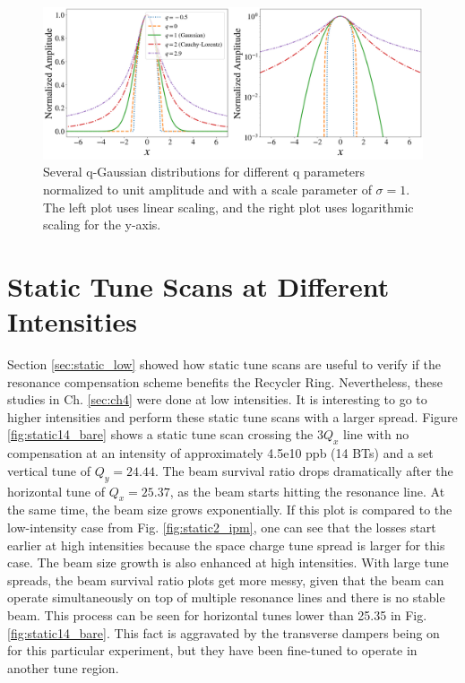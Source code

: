 \begin{figure}[H]
    \centering
    \includegraphics[width=\textwidth,keepaspectratio]{chapter6/qgaussians.png}
    \caption{Several q-Gaussian distributions for different q parameters normalized to unit amplitude and with a scale parameter of $\sigma=1$. The left plot uses linear scaling, and the right plot uses logarithmic scaling for the y-axis.}
    \label{fig:qgaussians}
\end{figure}


\section{\label{sec:static_high}Static Tune Scans at Different Intensities}

Section \ref{sec:static_low} showed how static tune scans are useful to verify if the resonance compensation scheme benefits the Recycler Ring. Nevertheless, these studies in Ch. \ref{sec:ch4} were done at low intensities. It is interesting to go to higher intensities and perform these static tune scans with a larger spread. Figure \ref{fig:static14_bare} shows a static tune scan crossing the $3Q_x$ line with no compensation at an intensity of approximately 4.5e10 ppb (14 BTs) and a set vertical tune of $Q_y=24.44$. The beam survival ratio drops dramatically after the horizontal tune of $Q_x=25.37$, as the beam starts hitting the resonance line. At the same time, the beam size grows exponentially. If this plot is compared to the low-intensity case from Fig. \ref{fig:static2_ipm}, one can see that the losses start earlier at high intensities because the space charge tune spread is larger for this case. The beam size growth is also enhanced at high intensities. With large tune spreads, the beam survival ratio plots get more messy, given that the beam can operate simultaneously on top of multiple resonance lines and there is no stable beam. This process can be seen for horizontal tunes lower than 25.35 in Fig. \ref{fig:static14_bare}. This fact is aggravated by the transverse dampers being on for this particular experiment, but they have been fine-tuned to operate in another tune region. 

